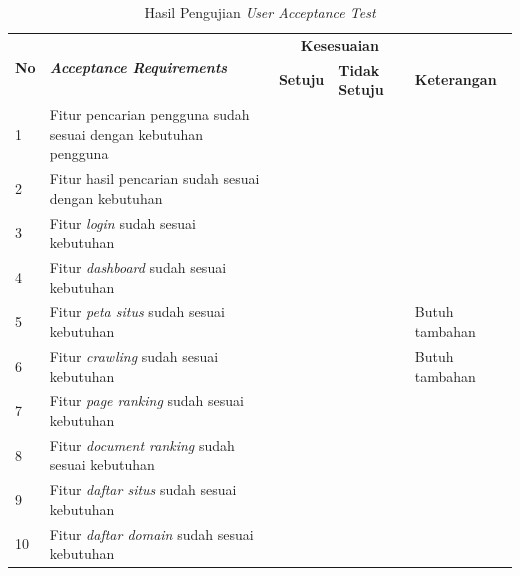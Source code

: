 \begin{longtable}{@{}|p{0.5cm}|p{5cm}|p{3cm}|p{3cm}|p{2cm}|@{}}
	
	\caption{Hasil Pengujian \textit{User Acceptance Test}}\\
	\hline
	\multirow{2}{5cm}{\textbf{No}} & \multirow{2}{5cm}{\textbf{\textit{Acceptance Requirements}}} & \multicolumn{2}{c|}{\textbf{Kesesuaian}} &	 \\
	\cline{3-4}
	\textbf{} & \textbf{\textit{}} & \textbf{Setuju} & \textbf{Tidak Setuju} & \textbf{Keterangan} \\
	\hline
	1 & Fitur pencarian pengguna sudah sesuai dengan kebutuhan pengguna & \checkmark & & \\
	\hline
	2 & Fitur hasil pencarian sudah sesuai dengan kebutuhan & \checkmark & & \\
	\hline
	3 & Fitur \textit{login} sudah sesuai kebutuhan & \checkmark & &   \\
	\hline
	4 & Fitur \textit{dashboard} sudah sesuai kebutuhan & \checkmark & & \\
	\hline
	5 & Fitur \textit{peta situs} sudah sesuai kebutuhan  &  & \checkmark & Butuh tambahan \\
		\hline
	6 & Fitur \textit{crawling} sudah sesuai kebutuhan &  & \checkmark & Butuh tambahan \\
		\hline
	7 & Fitur \textit{page ranking} sudah sesuai kebutuhan & \checkmark &  & \\
		\hline
	
	8 & Fitur \textit{document ranking} sudah sesuai kebutuhan & \checkmark &  &  \\
		\hline
	9 & Fitur \textit{daftar situs} sudah sesuai kebutuhan & \checkmark &  & \\
		\hline
	10 & Fitur \textit{daftar domain} sudah sesuai kebutuhan & \checkmark &  & \\

	
%	
	\hline
	
\end{longtable}
